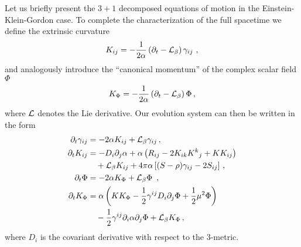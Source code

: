 Let us briefly present the $3+1$ decomposed equations of motion in the Einstein-Klein-Gordon case. To complete the characterization of the full spacetime we define the extrinsic curvature
\begin{equation}
\label{eq:KijDef}
K_{ij}  =   - \frac{1}{2\alpha} \left( \partial_{t} - \mathcal{L}_{\beta} \right) \gamma_{ij} \ ,
\end{equation}
and analogously introduce the ``canonical momentum'' of the complex scalar field $\Phi$
\begin{equation}
\label{eq:Kphi}
K_{\Phi} = -\frac{1}{2\alpha}  \left( \partial_{t} - \mathcal{L}_{\beta} \right) \Phi \,,
\end{equation}
where $\mathcal{L}$ denotes the Lie derivative.
%
Our evolution system can then be written in the form
%
%
\begin{subequations}
\begin{align}
  \p_{t} \gamma_{ij} & = - 2 \alpha K_{ij} + \Lie_{\beta} \gamma_{ij} \,,
                       \label{eq:dtgamma} \\
%
  \p_{t} K_{ij}      & =  - D_{i} \p_{j} \alpha
                       + \alpha \left( R_{ij} - 2 K_{ik} K^{k}{}_{j} + K K_{ij} \right) \nonumber \\
                       & \quad + \Lie_{\beta} K_{ij} 
                       + 4\pi \alpha \left[ (S-\rho) \gamma_{ij} - 2 S_{ij} \right] \,,
                                         \label{eq:dtKij} \\
% 
  \p_{t} \Phi & = - 2 \alpha K_\Phi + \Lie_{\beta} \Phi\
                \,, \label{eq:dtPhi} \\
%
  \p_{t} K_\Phi &  = \alpha \left( K K_{\Phi} - \frac{1}{2} \gamma^{ij} D_i \partial_j \Phi
                  + \frac{1}{2} \mu^2 \Phi \right) \nonumber \\
                 & \quad - \frac{1}{2} \gamma^{ij} \partial_i \alpha \partial_j \Phi
                       + \Lie_{\beta} K_\Phi \,, \label{eq:dtKphi}
\end{align}
\end{subequations}
% 
where $D_i$ is the covariant derivative with respect to the $3$-metric.


